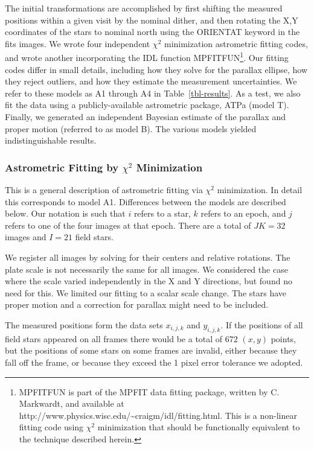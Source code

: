 \documentclass[12pt,preprint]{aastex}
\begin{document}
The initial transformations are accomplished by first shifting the measured
positions within a given visit by the nominal dither, and then 
rotating the X,Y coordinates of the stars to nominal north using the
ORIENTAT keyword in the fits images.
We wrote four independent $\chi^2$ minimization astrometric fitting codes, and
wrote another incorporating the IDL function
MPFITFUN\footnote{MPFITFUN is part of the MPFIT
data fitting package, written by C. Markwardt, and available at
http://www.physics.wisc.edu/\~{}craigm/idl/fitting.html. This is a non-linear
fitting code using $\chi^2$ minimization that should be functionally
equivalent to the technique described herein.}.
Our fitting codes
differ in small details, including how they solve for the parallax ellipse,
how they reject outliers, and how they estimate the measurement uncertainties.
We refer to these models as A1 through
A4 in Table~\ref{tbl-results}. As a test, we also fit the data using a
publicly-available astrometric package, ATPa (model T).
Finally, we generated an independent Bayesian estimate of the parallax
and proper motion (referred to as model B).
The various models yielded indistinguishable results.

\subsubsection{Astrometric Fitting by $\chi^2$ Minimization}

This is a general description of astrometric fitting via $\chi^2$ minimization.
In detail this corresponds to model A1. Differences between the models are
described below.
Our notation is such that $i$ refers to a star, $k$
refers to an epoch, and $j$ refers to one of the four images at that
epoch.  There are a total of $JK=32$ images and $I=21$ field stars.

We register all images by solving for their centers and relative
rotations. The plate scale is not necessarily the same for all images.
We considered the case where the scale varied independently in the X and Y
directions, but found no need for this. We limited our fitting to a scalar
scale change.
The stars have proper motion and a correction for parallax might need
to be included.

The measured positions form the data sets $x_{i,j,k}$ and $y_{i,j,k}$.
If the positions of all field stars appeared on all frames there would
be a total of 672 $(x,y)$ points, but the positions of some stars on
some frames are invalid, either because they fall off the frame, or because they
exceed the 1 pixel error tolerance we adopted.
\end{document}
